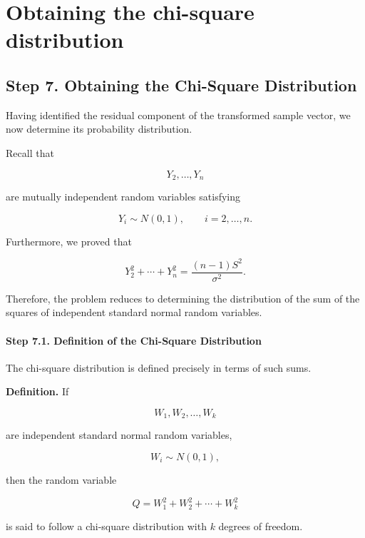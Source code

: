 \documentclass[11pt]{article}
\begin{document}
	
	\section{Obtaining the chi-square distribution}
	\begin{mdframed}[
		linewidth=0.8pt,
		roundcorner=6pt,
		backgroundcolor=gray!5,
		linecolor=gray!60,
		innertopmargin=10pt,
		innerbottommargin=10pt,
		innerleftmargin=10pt,
		innerrightmargin=10pt
		]
		
		\subsection*{Step 7. Obtaining the Chi-Square Distribution}
		
		Having identified the residual component of the transformed sample vector,
		we now determine its probability distribution.
		
		Recall that
		
		\[
		Y_2,\ldots,Y_n
		\]
		
		are mutually independent random variables satisfying
		
		\[
		Y_i\sim N(0,1),
		\qquad
		i=2,\ldots,n.
		\]
		
		Furthermore, we proved that
		
		\[
		\boxed{
			Y_2^2+\cdots+Y_n^2
			=
			\frac{(n-1)S^2}{\sigma^2}.
		}
		\]
		
		Therefore, the problem reduces to determining the distribution of the sum
		of the squares of independent standard normal random variables.
		
		\paragraph{Step 7.1. Definition of the Chi-Square Distribution}
		
		The chi-square distribution is defined precisely in terms of such sums.
		
		\medskip
		
		\textbf{Definition.}
		If
		
		\[
		W_1,W_2,\ldots,W_k
		\]
		
		are independent standard normal random variables,
		
		\[
		W_i\sim N(0,1),
		\]
		
		then the random variable
		
		\[
		\boxed{
			Q
			=
			W_1^2+W_2^2+\cdots+W_k^2
		}
		\]
		
		is said to follow a chi-square distribution with $k$ degrees of freedom.
		

\end{mdframed}
\end{document}

